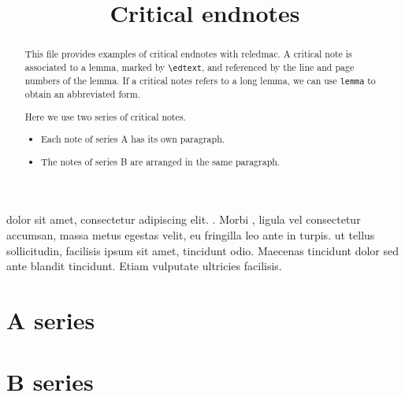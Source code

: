 \documentclass{article}
\begin{document}
\begin{english}
\date{}
\title{Critical endnotes}
\maketitle
\begin{abstract}
This file provides examples of critical endnotes with reledmac. 
A critical note is associated to a lemma, marked by \verb+\edtext+, and referenced by the line and page numbers of the lemma.
If a critical notes refers to a long lemma, we can use \verb+lemma+ to obtain an abbreviated form.

Here we use two series of critical notes. 
\begin{itemize}
\item Each note of series A has its own paragraph. 
\item The notes of series B are arranged in the same paragraph.
\end{itemize}
\end{abstract}
\end{english}

\beginnumbering
\pstart
{}
 dolor sit amet, consectetur adipiscing elit. 
 {
 }. 
Morbi , ligula vel consectetur accumsan, massa metus egestas velit, eu fringilla leo ante in turpis.  ut tellus sollicitudin, facilisis ipsum sit amet, tincidunt odio. Maecenas tincidunt dolor sed ante blandit tincidunt. Etiam vulputate ultricies facilisis.
\pend
\endnumbering

\section{A series}

\section{B series}
\end{document}
